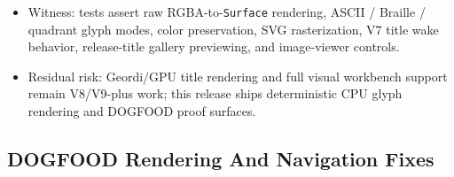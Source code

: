 \begin{itemize}
\item
  Witness: tests assert raw RGBA-to-\texttt{S\allowbreak{}u\allowbreak{}r\allowbreak{}f\allowbreak{}a\allowbreak{}c\allowbreak{}e} rendering, ASCII / Braille / quadrant glyph modes, color preservation, SVG rasterization, V7 title wake behavior, release-title gallery previewing, and image-viewer controls.
\item
  Residual risk: Geordi/GPU title rendering and full visual workbench support remain V8/V9-plus work; this release ships deterministic CPU glyph rendering and DOGFOOD proof surfaces.
\end{itemize}

\subsection{DOGFOOD Rendering And Navigation Fixes}\label{record-260-dogfood-rendering-and-navigation-fixes}


